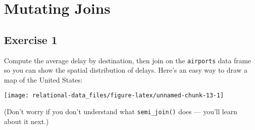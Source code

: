 \documentclass[]{book}
\newenvironment{Shaded}{\begin{snugshade}}{\end{snugshade}}
\newcommand{\CommentTok}[1]{\textcolor[rgb]{0.56,0.35,0.01}{\textit{#1}}}
\newcommand{\KeywordTok}[1]{\textcolor[rgb]{0.13,0.29,0.53}{\textbf{#1}}}
\newcommand{\NormalTok}[1]{#1}
\newcommand{\OperatorTok}[1]{\textcolor[rgb]{0.81,0.36,0.00}{\textbf{#1}}}
\newcommand{\StringTok}[1]{\textcolor[rgb]{0.31,0.60,0.02}{#1}}
\theoremstyle{plain}
\theoremstyle{remark}
\theoremstyle{definition}
\theoremstyle{definition}
\theoremstyle{definition}
\theoremstyle{remark}
\begin{document}
\hypertarget{mutating-joins}{%
\section{Mutating Joins}\label{mutating-joins}}

\begin{Shaded}
\end{Shaded}

\hypertarget{exercise-1-28}{%
\subsection{Exercise 1}\label{exercise-1-28}}

Compute the average delay by destination, then join on the
\texttt{airports} data frame so you can show the spatial distribution of
delays. Here's an easy way to draw a map of the United States:

\begin{Shaded}
\end{Shaded}

\begin{center}\texttt{[image: relational-data\_files/figure-latex/unnamed-chunk-13-1]} \end{center}

(Don't worry if you don't understand what \texttt{semi\_join()} does ---
you'll learn about it next.)
\end{document}
